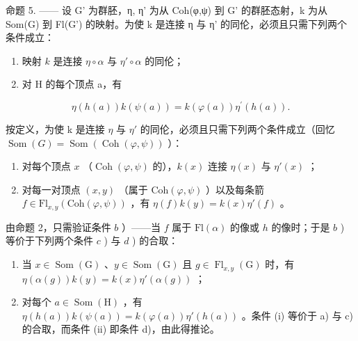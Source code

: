 命题 5. —— 设 G' 为群胚，η, η' 为从 Coh(φ,ψ) 到 G' 的群胚态射，k 为从 Som(G) 到 Fl(G') 的映射。为使 k 是连接 η 与 η' 的同伦，必须且只需下列两个条件成立：

\begin{enumerate}
\def\labelenumi{(\roman{enumi})}
\item
  映射 \(k\) 是连接 \(\eta \circ \alpha\) 与 \(\eta' \circ \alpha\) 的同伦；
\item
  对 H 的每个顶点 a，有
\end{enumerate}

\[
\eta (h (a)) k (\psi (a)) = k (\varphi (a)) \eta^ {\prime} (h (a)).
\]

按定义，为使 k 是连接 \(\eta\) 与 \(\eta'\) 的同伦，必须且只需下列两个条件成立（回忆 \(\operatorname{Som}(G) = \operatorname{Som}(\operatorname{Coh}(\varphi, \psi))\) ）：

\begin{enumerate}
\def\labelenumi{\alph{enumi})}
\item
  对每个顶点 \(x\) （\(\operatorname{Coh}(\varphi, \psi)\) 的），\(k(x)\) 连接 \(\eta(x)\) 与 \(\eta'(x)\) ；
\item
  对每一对顶点 \((x,y)\) （属于 \(\mathrm{Coh}(\varphi,\psi)\) ）以及每条箭 \(f\in\mathrm{Fl}_{x,y}(\mathrm{Coh}(\varphi,\psi))\) ，有 \(\eta(f)k(y)=k(x)\eta'(f)\) 。
\end{enumerate}

由命题 2，只需验证条件 \(b\) ）——当 \(f\) 属于 \(\mathrm{Fl}(\alpha)\) 的像或 \(h\) 的像时；于是 \(b\) ) 等价于下列两个条件 \(c\) ) 与 \(d\) ) 的合取：

\begin{enumerate}
\def\labelenumi{\alph{enumi})}
\setcounter{enumi}{2}
\item
  当 \(x \in \operatorname{Som}(\mathrm{G})\) 、\(y \in \operatorname{Som}(\mathrm{G})\) 且 \(g \in \operatorname{Fl}_{x,y}(\mathrm{G})\) 时，有 \(\eta(\alpha(g))k(y) = k(x)\eta'(\alpha(g))\) ；
\item
  对每个 \(a \in \operatorname{Som}(\mathrm{H})\) ，有 \(\eta(h(a))k(\psi(a)) = k(\varphi(a))\eta'(h(a))\) 。条件 (i) 等价于 a) 与 c) 的合取，而条件 (ii) 即条件 d)，由此得推论。
\end{enumerate}


